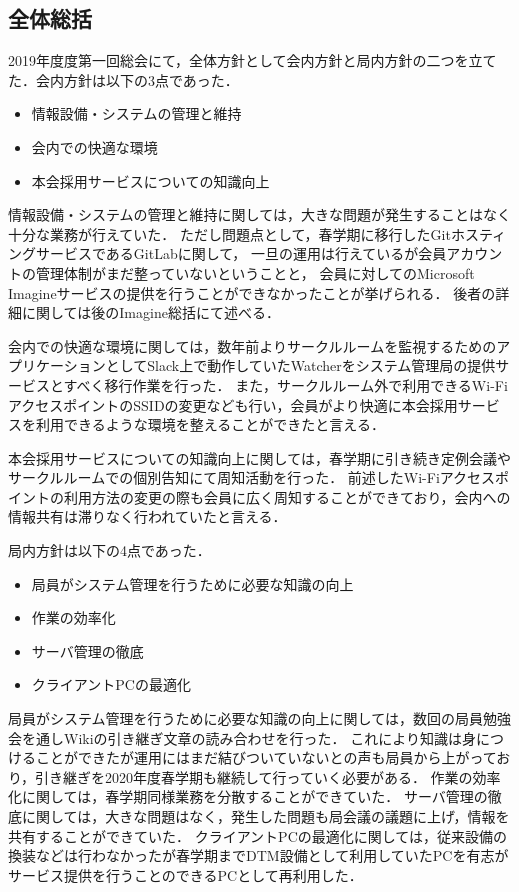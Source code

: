 \subsection*{全体総括}


2019年度度第一回総会にて，全体方針として会内方針と局内方針の二つを立てた．会内方針は以下の3点であった．
\begin{itemize}
  \item 情報設備・システムの管理と維持
  \item 会内での快適な環境
  \item 本会採用サービスについての知識向上
\end{itemize}

情報設備・システムの管理と維持に関しては，大きな問題が発生することはなく十分な業務が行えていた．
ただし問題点として，春学期に移行したGitホスティングサービスであるGitLabに関して，
一旦の運用は行えているが会員アカウントの管理体制がまだ整っていないということと，
会員に対してのMicrosoft Imagineサービスの提供を行うことができなかったことが挙げられる．
後者の詳細に関しては後のImagine総括にて述べる．

会内での快適な環境に関しては，数年前よりサークルルームを監視するためのアプリケーションとしてSlack上で動作していたWatcherをシステム管理局の提供サービスとすべく移行作業を行った．
また，サークルルーム外で利用できるWi-FiアクセスポイントのSSIDの変更なども行い，会員がより快適に本会採用サービスを利用できるような環境を整えることができたと言える．

本会採用サービスについての知識向上に関しては，春学期に引き続き定例会議やサークルルームでの個別告知にて周知活動を行った．
前述したWi-Fiアクセスポイントの利用方法の変更の際も会員に広く周知することができており，会内への情報共有は滞りなく行われていたと言える．

局内方針は以下の4点であった．
\begin{itemize}
  \item 局員がシステム管理を行うために必要な知識の向上
  \item 作業の効率化
  \item サーバ管理の徹底
  \item クライアントPCの最適化
\end{itemize}

局員がシステム管理を行うために必要な知識の向上に関しては，数回の局員勉強会を通しWikiの引き継ぎ文章の読み合わせを行った．
これにより知識は身につけることができたが運用にはまだ結びついていないとの声も局員から上がっており，引き継ぎを2020年度春学期も継続して行っていく必要がある．
作業の効率化に関しては，春学期同様業務を分散することができていた．
サーバ管理の徹底に関しては，大きな問題はなく，発生した問題も局会議の議題に上げ，情報を共有することができていた．
クライアントPCの最適化に関しては，従来設備の換装などは行わなかったが春学期までDTM設備として利用していたPCを有志がサービス提供を行うことのできるPCとして再利用した．
